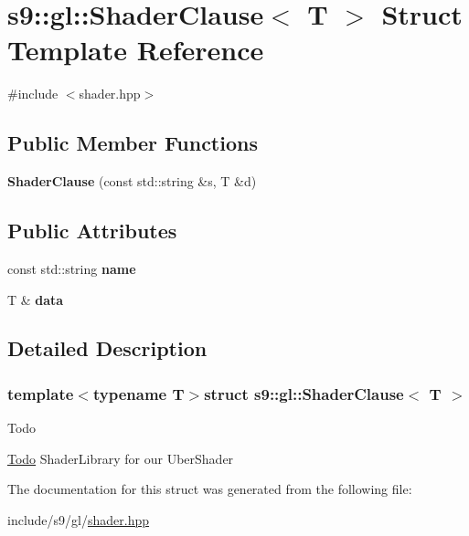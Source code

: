 \hypertarget{structs9_1_1gl_1_1ShaderClause}{\section{s9\-:\-:gl\-:\-:Shader\-Clause$<$ T $>$ Struct Template Reference}
\label{structs9_1_1gl_1_1ShaderClause}
}


{\ttfamily \#include $<$shader.\-hpp$>$}

\subsection*{Public Member Functions}
\begin{DoxyCompactItemize}
\item 
\hypertarget{structs9_1_1gl_1_1ShaderClause_aceec199095dc433e82610a36607ecbcd}{{\bfseries Shader\-Clause} (const std\-::string \&s, T \&d)}\label{structs9_1_1gl_1_1ShaderClause_aceec199095dc433e82610a36607ecbcd}

\end{DoxyCompactItemize}
\subsection*{Public Attributes}
\begin{DoxyCompactItemize}
\item 
\hypertarget{structs9_1_1gl_1_1ShaderClause_ac37757283f4a458800a6cd0f0ed2e0e8}{const std\-::string {\bfseries name}}\label{structs9_1_1gl_1_1ShaderClause_ac37757283f4a458800a6cd0f0ed2e0e8}

\item 
\hypertarget{structs9_1_1gl_1_1ShaderClause_a01fa75de8fa2b1e96ca10fb605a8b128}{T \& {\bfseries data}}\label{structs9_1_1gl_1_1ShaderClause_a01fa75de8fa2b1e96ca10fb605a8b128}

\end{DoxyCompactItemize}


\subsection{Detailed Description}
\subsubsection*{template$<$typename T$>$struct s9\-::gl\-::\-Shader\-Clause$<$ T $>$}

\begin{DoxyRefDesc}{Todo}
\item[\hyperlink{todo__todo000027}{Todo}]Shader\-Library for our Uber\-Shader \end{DoxyRefDesc}


The documentation for this struct was generated from the following file\-:\begin{DoxyCompactItemize}
\item 
include/s9/gl/\hyperlink{shader_8hpp}{shader.\-hpp}\end{DoxyCompactItemize}
